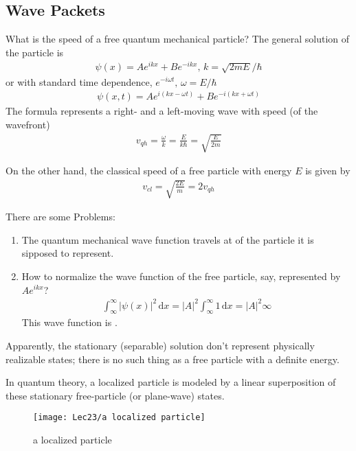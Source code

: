 \subsection{Wave Packets}
What is the speed of a free quantum mechanical particle? The general solution of the particle is 
\begin{align*}
    \psi(x)=Ae^{ikx}+Be^{-ikx}, \, k=\sqrt{2mE}/\hbar
\end{align*}
or with standard time dependence, $e^{-i\omega t}, \, \omega=E/\hbar$
\begin{align*}
    \psi(x,t)=Ae^{i(kx-\omega t)}+Be^{-i(kx+\omega t)}
\end{align*}
The formula represents a right- and a left-moving wave with speed (of the wavefront)
\begin{align*}
    v_{qh}=\frac{\omega}{k}=\frac{E}{k\hbar}=\sqrt{\frac{E}{2m}}
\end{align*}

On the other hand, the classical speed of a free particle with energy $E$ is given by 
\begin{align*}
    v_{cl}=\sqrt{\frac{2E}{m}}=2v_{qh}
\end{align*}

There are some Problems:
\begin{enumerate}
    \item The quantum mechanical wave function travels at  of the particle it is sipposed to represent. 
    \item How to normalize the wave function of the free particle, say, represented by $Ae^{ikx}$? 
    \begin{align*}
        \int_{\infty}^{\infty}|\psi(x)|^2\,\mathrm{d}x=|A|^2\int_{\infty}^{\infty}1\,\mathrm{d} x=|A|^2\infty
    \end{align*}
    This wave function is . 
\end{enumerate}

Apparently, the stationary (separable) solution don't represent physically realizable states; there is no such thing as a free particle with a definite energy. 

In quantum theory, a localized particle is modeled by a linear superposition of these stationary free-particle (or plane-wave) states.

\begin{figure}[H]
    \centering
    \texttt{[image: Lec23/a localized particle]}
    \caption{a localized particle}
\end{figure}

